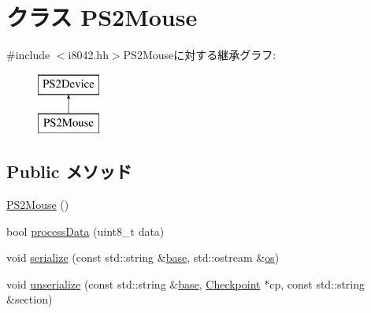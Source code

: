 \hypertarget{classX86ISA_1_1PS2Mouse}{
\section{クラス PS2Mouse}
\label{classX86ISA_1_1PS2Mouse}
}


{\ttfamily \#include $<$i8042.hh$>$}PS2Mouseに対する継承グラフ:\begin{figure}[H]
\begin{center}
\leavevmode
\includegraphics[height=2cm]{classX86ISA_1_1PS2Mouse}
\end{center}
\end{figure}
\subsection*{Public メソッド}
\begin{DoxyCompactItemize}
\item 
\hyperlink{classX86ISA_1_1PS2Mouse_a7445002f3bb5ca2ff1fbacb583d8d4b6}{PS2Mouse} ()
\item 
bool \hyperlink{classX86ISA_1_1PS2Mouse_a501fdeaf8d614f432cfbf95f23675982}{processData} (uint8\_\-t data)
\item 
void \hyperlink{classX86ISA_1_1PS2Mouse_ab4138b21b48e3371a8e20df72b675a88}{serialize} (const std::string \&\hyperlink{namespaceX86ISA_a22fd87812cbb48f6d80b6cc7957490cf}{base}, std::ostream \&\hyperlink{namespaceX86ISA_a6b6e6ba763e7eaf46ac5b6372ca98d30}{os})
\item 
void \hyperlink{classX86ISA_1_1PS2Mouse_a147c320e3d6506edf5587a40cd8e430d}{unserialize} (const std::string \&\hyperlink{namespaceX86ISA_a22fd87812cbb48f6d80b6cc7957490cf}{base}, \hyperlink{classCheckpoint}{Checkpoint} $\ast$cp, const std::string \&section)
\end{DoxyCompactItemize}
